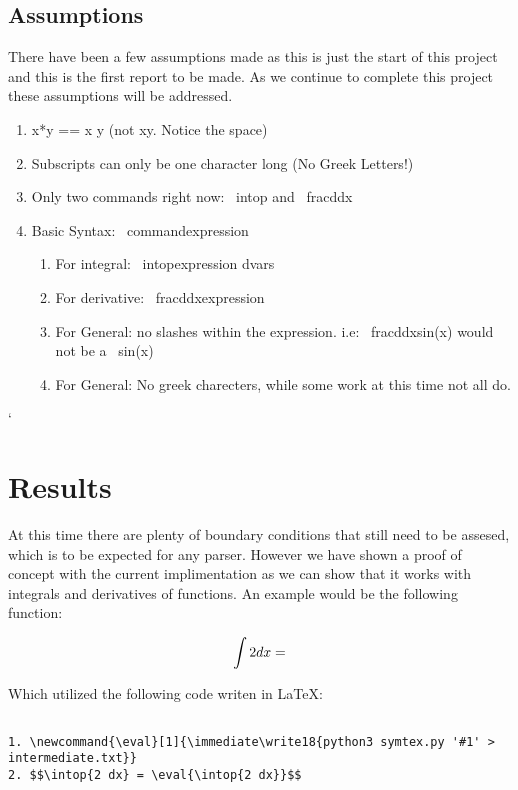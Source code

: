 \documentclass[english]{article}
\newcommand{\eval}[1]{\immediate\write18{python3 symtex.py '#1' > intermediate.txt}}
\begin{document}
\subsection{Assumptions}

There have been a few assumptions made as this is just the start of this project and this is the first report to be made. As we continue to complete this project these assumptions will be addressed.

\begin{enumerate}
  \item {x*y == x y (not xy. Notice the space)}
  \item {Subscripts can only be one character long (No Greek Letters!)}
  \item {Only two commands right now: \ intop and \ frac{d}{dx}}
  \item {Basic Syntax: \ command{expression}}
  \begin{enumerate}
    \item {For integral: \ intop{expression dvars}}
    \item {For derivative: \ frac{d}{dx}{expression}}
    \item {For General: no slashes within the expression. i.e: \ frac{d}{dx}{sin(x)} would not be a \ sin(x)}
    \item {For General: No greek charecters, while some work at this time not all do.}
  \end{enumerate}
\end{enumerate}`

\section{Results}

At this time there are plenty of boundary conditions that still need to be assesed, which is to be expected for any parser. However we have shown a proof of concept with the current implimentation as we can show that it works with integrals and derivatives of functions. An example would be the following function:

$$\intop{2 dx} = \eval{\intop{2 dx}} $$

Which utilized the following code writen in \LaTeX:

\begin{lstlisting}

1. \newcommand{\eval}[1]{\immediate\write18{python3 symtex.py '#1' > intermediate.txt}}
2. $$\intop{2 dx} = \eval{\intop{2 dx}}$$

\end{lstlisting}
\end{document}
